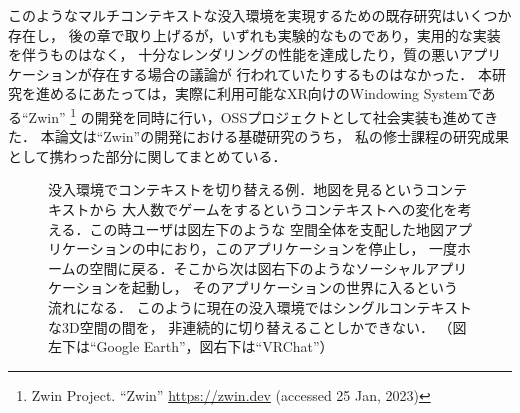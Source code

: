 このようなマルチコンテキストな没入環境を実現するための既存研究はいくつか存在し，
後の章で取り上げるが，いずれも実験的なものであり，実用的な実装を伴うものはなく，
十分なレンダリングの性能を達成したり，質の悪いアプリケーションが存在する場合の議論が
行われていたりするものはなかった．
本研究を進めるにあたっては，実際に利用可能なXR向けのWindowing Systemである``Zwin''
\footnote{Zwin Project. ``Zwin'' \url{https://zwin.dev} (accessed 25 Jan, 2023)}
の開発を同時に行い，OSSプロジェクトとして社会実装も進めてきた．
本論文は``Zwin''の開発における基礎研究のうち，
私の修士課程の研究成果として携わった部分に関してまとめている．

\begin{figure}[htbp]
  \centering
  \caption[]{
    没入環境でコンテキストを切り替える例．地図を見るというコンテキストから
    大人数でゲームをするというコンテキストへの変化を考える．この時ユーザは図左下のような
    空間全体を支配した地図アプリケーションの中におり，このアプリケーションを停止し，
    一度ホームの空間に戻る．そこから次は図右下のようなソーシャルアプリケーションを起動し，
    そのアプリケーションの世界に入るという流れになる．
    このように現在の没入環境ではシングルコンテキストな3D空間の間を，
    非連続的に切り替えることしかできない．
    （図左下は``Google Earth\footnotemark[4]''，図右下は``VRChat\footnotemark[5]''）
  }
  \label{fig:switching-app}
\end{figure}



